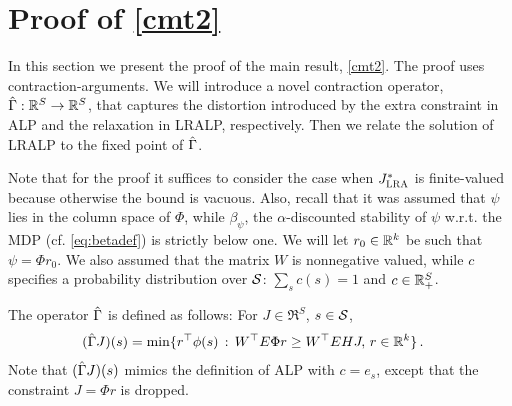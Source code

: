 \documentclass[twocolumn]{IEEEtran}
\begin{document}
\section{Proof of \cref{cmt2}}\label{sec:improv}
In this section we present the proof of the main result, \cref{cmt2}.
The proof uses contraction-arguments.
\newcommand{\G}{\Gamma}
We will introduce a novel contraction operator, $\hg: \Re^S \to \Re^S$, that captures the distortion introduced
by the extra constraint in ALP and the relaxation in LRALP, respectively.
Then we relate the solution of LRALP to the fixed point of $\hg$.

Note that for the proof it suffices to consider the case when $\Jlro$ is finite-valued because otherwise the bound is vacuous.
Also, recall that it was assumed that $\psi$ lies in the column space of $\Phi$, while $\beta_\psi$, the $\alpha$-discounted stability of $\psi$ w.r.t. the MDP (cf. \eqref{eq:betadef}) is strictly below one. We will let $r_0\in \R^k$ be such that $\psi = \Phi r_0$.
We also assumed that the matrix $W$ is nonnegative valued, while $c$ specifies a probability distribution over $\S$: $\sum_s c(s) = 1$ and $c\in \R_+^S$.

The operator $\hg$ is defined as follows: For $J\in \Re^S$, $s\in \S$,
\begin{align*}
(\hg J)(s) & = \min\{ r^\top \phi(s) \,:\, W^\top E \Phi r \ge W^\top E H J ,\, r\in \Re^k\}\,.
\end{align*}
Note that $(\hg J)(s)$ mimics the definition of ALP with $c = e_s$, except that the constraint $J = \Phi r$ is dropped.
\end{document}
